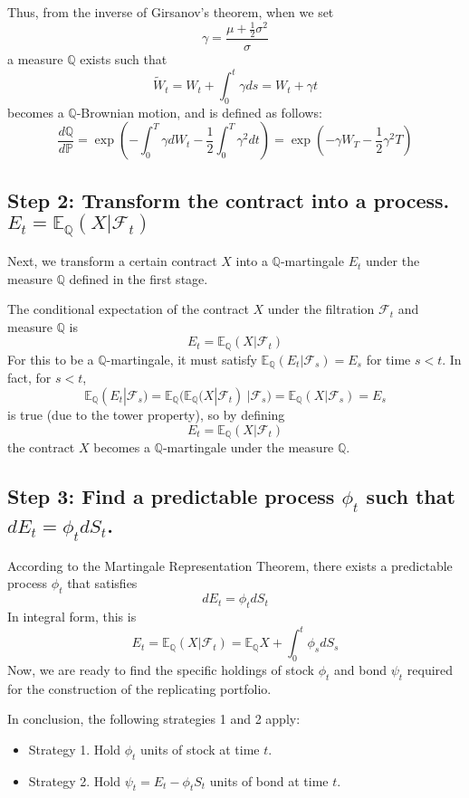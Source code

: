 \documentclass[uplatex,a4j,12pt,dvipdfmx]{jsarticle}
\begin{document}
Thus, from the inverse of Girsanov's theorem, when we set
$$ \gamma = \dfrac{ \mu + \frac{1}{2} \sigma^{2} }{\sigma} $$
a measure $\mathbb{Q}$ exists such that
$$ \tilde{W}_{t} = W_{t} + \int^{t}_{0} \gamma ds = W_{t} + \gamma t $$
becomes a $\mathbb{Q}$-Brownian motion, and is defined as follows:
$$ \dfrac{d \mathbb{Q}}{d \mathbb{P}} = \exp \left( - \int^{T}_{0} \gamma d W_{t} - \dfrac{1}{2} \int^{T}_{0} \gamma^{2} dt \right) = \exp \left( - \gamma W_{T} - \dfrac{1}{2} \gamma^{2} T \right) $$

\subsection{Step 2: Transform the contract into a process. $E_{t} = \mathbb{E}_{\mathbb{Q}}( X | \mathcal{F}_{t})$}
Next, we transform a certain contract $X$ into a $\mathbb{Q}$-martingale $E_{t}$ under the measure $\mathbb{Q}$ defined in the first stage.

The conditional expectation of the contract $X$ under the filtration $\mathcal{F}_{t}$ and measure $\mathbb{Q}$ is
$$E_{t} = \mathbb{E}_{\mathbb{Q}}(X|\mathcal{F}_{t})$$
For this to be a $\mathbb{Q}$-martingale, it must satisfy $\mathbb{E}_{\mathbb{Q}}( E_{t} | \mathcal{F}_{s} ) = E_{s}$ for time $s<t$. In fact, for $s<t$,
$$ \mathbb{E}_{\mathbb{Q}}( E_{t} | \mathcal{F}_{s} ) = \mathbb{E}_{\mathbb{Q}} \Big( \mathbb{E}_{\mathbb{Q}}(X|\mathcal{F}_{t}) \ | \mathcal{F}_{s} \Big) = \mathbb{E}_{\mathbb{Q}}(X|\mathcal{F}_{s}) = E_{s} $$
is true (due to the tower property), so by defining
$$ E_{t} = \mathbb{E}_{\mathbb{Q}}(X|\mathcal{F}_{t}) $$
the contract $X$ becomes a $\mathbb{Q}$-martingale under the measure $\mathbb{Q}$.

\subsection{Step 3: Find a predictable process $\phi_{t}$ such that $dE_{t} = \phi_{t} d S_{t}$.}
According to the Martingale Representation Theorem, there exists a predictable process $\phi_{t}$ that satisfies
$$dE_{t} = \phi_{t} dS_{t}$$
In integral form, this is
$$E_{t} = \mathbb{E}_{\mathbb{Q}}(X|\mathcal{F}_{t}) = \mathbb{E}_{\mathbb{Q}} X + \int^{t}_{0} \phi_{s} d S_{s}$$
Now, we are ready to find the specific holdings of stock $\phi_{t}$ and bond $\psi_{t}$ required for the construction of the replicating portfolio.

In conclusion, the following strategies 1 and 2 apply:
\begin{itemize}
	\item Strategy 1. Hold $\phi_{t}$ units of stock at time $t$.
	\item Strategy 2. Hold $\psi_{t} = E_{t} - \phi_{t} S_{t}$ units of bond at time $t$.
\end{itemize}
\end{document}
